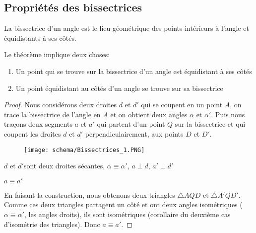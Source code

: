 \documentclass[a4paper,12pt]{article}
\begin{document}
\pagebreak
\subsection{Propriétés des bissectrices}
\begin{theorem}
La bissectrice d'un angle est le lieu géométrique des points intérieurs à l'angle et équidistants à ses côtés.
\end{theorem}
Le théorème implique deux choses:
\begin{enumerate}
\item Un point qui se trouve sur la bissectrice d'un angle est équidistant à ses côtés
\item Un point équidistant au côtés d'un angle se trouve sur sa bissectrice
\end{enumerate}
\begin{proof}
Nous considérons deux droites $d$ et $d'$ qui se coupent en un point $A$, on trace la bissectrice de l'angle en $A$ et on obtient deux angles $\alpha$ et $\alpha'$. Puis nous traçons deux segments $a$ et $a'$ qui partent d'un point $Q$ sur la bissectrice et qui coupent les droites $d$ et $d'$ perpendiculairement, aux points $D$ et $D'$.
\begin{figure}[H]
    \centering
    \texttt{[image: schema/Bissectrices\_1.PNG]}
\end{figure}


\begin{hyp}
$d$ et $d'$sont deux droites sécantes, $\alpha \equiv \alpha'$, $a\perp d$, $a' \perp d'$
\end{hyp}
\begin{concl}
$a\equiv a'$
\end{concl}
En faisant la construction, nous obtenons deux triangles $\triangle AQD$ et $\triangle A'QD'$. Comme ces deux triangles partagent un côté et ont deux angles isométriques ($\alpha \equiv \alpha'$, les angles droits), ils sont isométriques (corollaire du deuxième cas d'isométrie des triangles). Donc $a \equiv a'$.
\end{proof}
\end{document}
